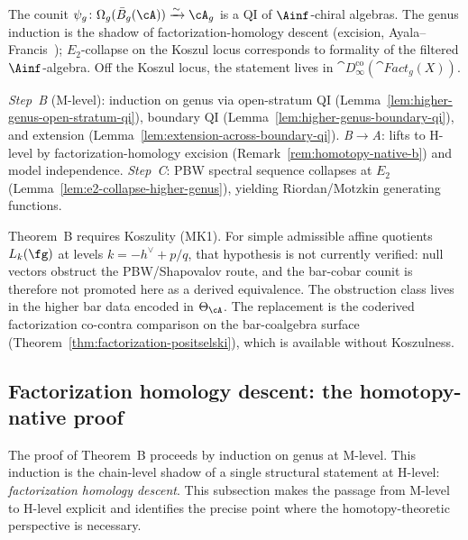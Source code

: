 \begin{remark}\label{rem:homotopy-native-b}
The counit $\psi_g\colon\Omega_g(\bar{B}_g(\cA))\xrightarrow{\sim}\cA_g$
is a QI of $\Ainf$-chiral algebras.
The genus induction is the shadow of factorization-homology descent
(excision, Ayala--Francis~\cite{AF15}); $E_2$-collapse on the Koszul
locus corresponds to formality of the filtered $\Ainf$-algebra.
Off the Koszul locus, the statement lives in
$\cat{D}^{\mathrm{co}}_\infty(\cat{Fact}_g(X))$.
\end{remark}

\begin{remark}
\label{rem:theorem-b-model}
\emph{Step~B} (M-level): induction on genus via open-stratum QI
(Lemma~\ref{lem:higher-genus-open-stratum-qi}), boundary QI
(Lemma~\ref{lem:higher-genus-boundary-qi}), and extension
(Lemma~\ref{lem:extension-across-boundary-qi}).
\emph{B$\to$A}: lifts to H-level by factorization-homology excision
(Remark~\ref{rem:homotopy-native-b}) and model independence.
\emph{Step~C}: PBW spectral sequence collapses at $E_2$
(Lemma~\ref{lem:e2-collapse-higher-genus}), yielding Riordan/Motzkin
generating functions.
\end{remark}

\begin{remark}
\label{rem:admissible-scope-boundary}
Theorem~B requires Koszulity (MK1). For simple admissible affine
quotients $L_k(\fg)$ at levels $k=-h^\vee+p/q$, that hypothesis is
not currently verified: null vectors obstruct the PBW/Shapovalov
route, and the bar-cobar counit is therefore not promoted here as a
derived equivalence. The obstruction class lives in the higher bar
data encoded in $\Theta_\cA$.
The replacement is the coderived factorization co-contra comparison on
the bar-coalgebra surface
\textup{(}Theorem~\ref{thm:factorization-positselski}\textup{)},
which is available without Koszulness.
\end{remark}

\subsection{Factorization homology descent: the homotopy-native proof}
\label{subsec:fh-descent}

The proof of Theorem~B proceeds by induction on genus at M-level.
This induction is the chain-level shadow of a
single structural statement at H-level: \emph{factorization
homology descent}. This subsection makes the passage from
M-level to H-level explicit and identifies the precise point
where the homotopy-theoretic perspective is necessary.

